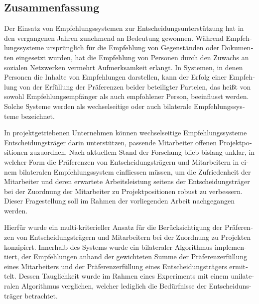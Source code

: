 \begin{otherlanguage}{ngerman}
\chapter*{Zusammenfassung}
Der Einsatz von Empfehlungssystemen zur Entscheidungsunterstützung hat in den vergangenen Jahren zunehmend an Bedeutung gewonnen.
Während Empfehlungssysteme ursprünglich für die Empfehlung von Gegenständen oder Dokumenten eingesetzt wurden, hat die Empfehlung von Personen durch den Zuwachs an sozialen Netzwerken vermehrt Aufmerksamkeit erlangt.
In Systemen, in denen Personen die Inhalte von Empfehlungen darstellen, kann der Erfolg einer Empfehlung von der Erfüllung der Präferenzen beider beteiligter Parteien, das heißt von sowohl Empfehlungsempfänger als auch empfohlener Person, beeinflusst werden.
Solche Systeme werden als wechselseitige oder auch bilaterale Empfehlungssysteme bezeichnet.

In projektgetriebenen Unternehmen können wechselseitige Empfehlungssysteme Entscheidungsträger darin unterstützen, passende Mitarbeiter offenen Projektpositionen zuzuordnen.
Nach aktuellem Stand der Forschung blieb bislang unklar, in welcher Form die Präferenzen von Entscheidungsträgern und Mitarbeitern in einem bilateralen Empfehlungssystem einfliessen müssen, um die Zufriedenheit der Mitarbeiter und deren erwartete Arbeitsleistung seitens der Entscheidungsträger bei der Zuordnung der Mitarbeiter zu Projektpositionen robust zu verbessern.
Dieser Fragestellung soll im Rahmen der vorliegenden Arbeit nachgegangen werden.

Hierfür wurde ein multi-kriterieller Ansatz für die Berücksichtigung der Präferenzen von Entscheidungsträgern und Mitarbeitern bei der Zuordnung zu Projekten konzipiert.
Innerhalb des Systems wurde ein bilateraler Algorithmus implementiert, der Empfehlungen anhand der gewichteten Summe der Präferenzerfüllung eines Mitarbeiters und der Präferenzerfüllung eines Entscheidungsträgers ermittelt.
Dessen Tauglichkeit wurde im Rahmen eines Experiments mit einem unilateralen Algorithmus verglichen, welcher lediglich die Bedürfnisse der Entscheidunsträger betrachtet.


\end{otherlanguage}
